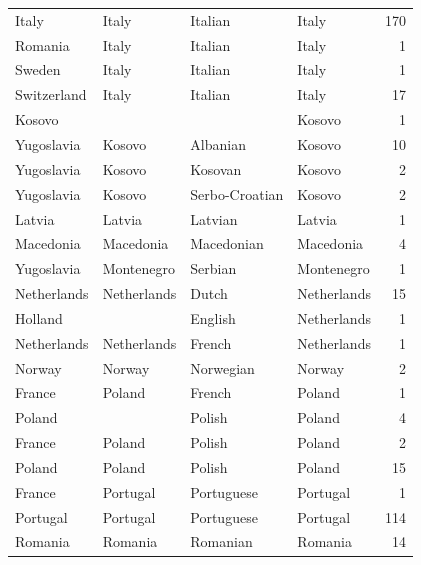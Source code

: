 \documentclass{article}
\begin{document}
\begin{table}[!htp]
\begin{center}
\begin{tabular}{|l|l|l||l|r|}
           Italy &          Italy &          Italian &          Italy &  170 \\
         Romania &          Italy &          Italian &          Italy &    1 \\
          Sweden &          Italy &          Italian &          Italy &    1 \\
     Switzerland &          Italy &          Italian &          Italy &   17 \\
          Kosovo &                &                  &         Kosovo &    1 \\
      Yugoslavia &         Kosovo &         Albanian &         Kosovo &   10 \\
      Yugoslavia &         Kosovo &          Kosovan &         Kosovo &    2 \\
      Yugoslavia &         Kosovo &   Serbo-Croatian &         Kosovo &    2 \\
          Latvia &         Latvia &          Latvian &         Latvia &    1 \\
       Macedonia &      Macedonia &       Macedonian &      Macedonia &    4 \\
      Yugoslavia &     Montenegro &          Serbian &     Montenegro &    1 \\
     Netherlands &    Netherlands &            Dutch &    Netherlands &   15 \\
         Holland &                &          English &    Netherlands &    1 \\
     Netherlands &    Netherlands &           French &    Netherlands &    1 \\
          Norway &         Norway &        Norwegian &         Norway &    2 \\
          France &         Poland &           French &         Poland &    1 \\
          Poland &                &           Polish &         Poland &    4 \\
          France &         Poland &           Polish &         Poland &    2 \\
          Poland &         Poland &           Polish &         Poland &   15 \\
          France &       Portugal &       Portuguese &       Portugal &    1 \\
        Portugal &       Portugal &       Portuguese &       Portugal &  114 \\
         Romania &        Romania &         Romanian &        Romania &   14 \\

\end{tabular}
\end{center}
\end{table}
\end{document}
